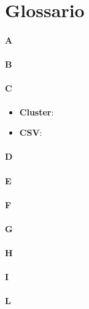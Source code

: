 \appendix
\section{Glossario}
\paragraph*{A}

\paragraph*{B}

\paragraph*{C}

\begin{itemize}
	\item \textbf{Cluster}:
	
	\item \textbf{CSV}:
	
	
\end{itemize}

\paragraph*{D}

\paragraph*{E}

\paragraph*{F}

\paragraph*{G}

\paragraph*{H}

\paragraph*{I}

\paragraph*{L}

